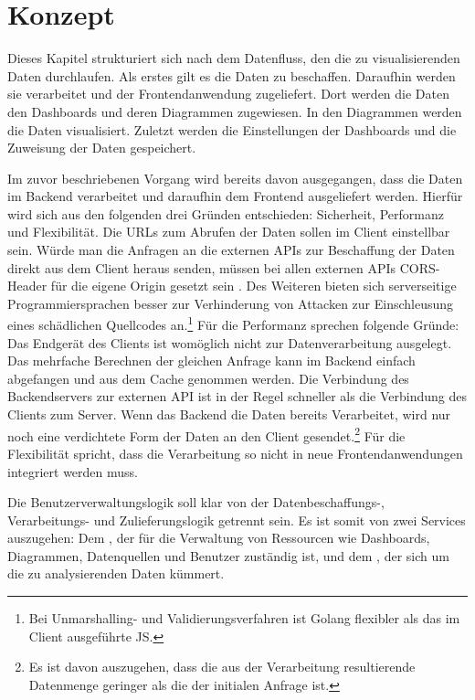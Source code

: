\chapter{Konzept}
\label{chap:konzept}
\setcounter{footnote}{0}
Dieses Kapitel strukturiert sich nach dem Datenfluss, den die
zu visualisierenden Daten durchlaufen. Als erstes
gilt es die Daten zu beschaffen. Daraufhin werden sie verarbeitet und
der \foreignlanguage{english}{Frontendanwendung} zugeliefert. Dort werden die Daten den Dashboards
und deren Diagrammen zugewiesen. In den Diagrammen werden die Daten
visualisiert. Zuletzt werden die Einstellungen der Dashboards
und die Zuweisung der Daten gespeichert.

Im zuvor beschriebenen Vorgang wird bereits davon ausgegangen, dass die Daten im Backend
verarbeitet und daraufhin dem \foreignlanguage{english}{Frontend} ausgeliefert werden. Hierfür wird sich aus den
folgenden drei Gründen entschieden: Sicherheit, Performanz und Flexibilität. Die URLs
zum Abrufen der Daten sollen im Client einstellbar sein. Würde man die Anfragen an
die externen APIs zur Beschaffung der Daten direkt aus dem Client heraus senden,
müssen bei allen externen APIs CORS-Header für die eigene Origin gesetzt sein \cite{CORSW3C}.
Des Weiteren bieten sich serverseitige Programmiersprachen besser zur Verhinderung
von Attacken zur Einschleusung eines schädlichen Quellcodes an.\footnote{Bei
Unmarshalling- und Validierungsverfahren ist Golang flexibler als das im Client ausgeführte JS.}
Für die Performanz sprechen folgende Gründe: Das Endgerät des Clients ist womöglich
nicht zur Datenverarbeitung ausgelegt. Das mehrfache Berechnen der gleichen Anfrage
kann im Backend einfach abgefangen und aus dem Cache genommen werden. Die Verbindung
des \foreignlanguage{english}{Backendservers} zur externen API ist in der Regel schneller als die Verbindung
des Clients zum Server. Wenn das Backend die Daten bereits Verarbeitet, wird nur noch
eine verdichtete Form der Daten an den Client gesendet.\footnote{Es ist davon auszugehen, dass
die aus der Verarbeitung resultierende Datenmenge geringer als die der initialen Anfrage ist.}
Für die Flexibilität spricht, dass die Verarbeitung so nicht in neue \foreignlanguage{english}{Frontendanwendungen}
integriert werden muss.

Die Benutzerverwaltungslogik soll klar von der Datenbeschaffungs-, Verarbeitungs-
und Zulieferungslogik getrennt sein. Es ist somit von zwei Services auszugehen:
Dem , der für die Verwaltung von Ressourcen wie Dashboards,
Diagrammen, Datenquellen und Benutzer zuständig ist, und dem ,
der sich um die zu analysierenden Daten kümmert.

